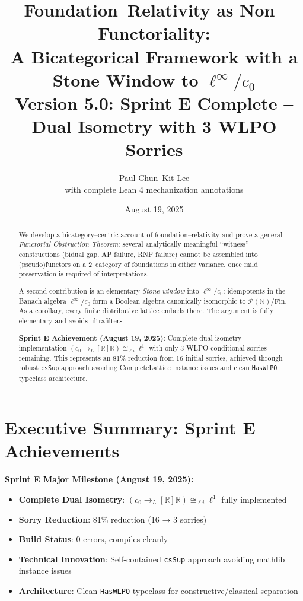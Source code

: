 \documentclass[11pt]{article}
\title{Foundation--Relativity as Non--Functoriality:\\
A Bicategorical Framework with a Stone Window to \(\ell^\infty/c_0\)\\
\large{Version 5.0: Sprint E Complete -- Dual Isometry with 3 WLPO Sorries}}
\author{Paul Chun--Kit Lee\\
\small{with complete Lean 4 mechanization annotations}}
\date{August 19, 2025}
\theoremstyle{definition}
\theoremstyle{remark}
\newcommand{\sprintE}{\textcolor{orange!70!black}{\textbf{Sprint E}}}
\begin{document}
\maketitle

\begin{abstract}
We develop a bicategory--centric account of foundation--relativity and prove a general \emph{Functorial Obstruction Theorem}: several analytically meaningful ``witness'' constructions (bidual gap, AP failure, RNP failure) cannot be assembled into (pseudo)functors on a 2--category of foundations in either variance, once mild preservation is required of interpretations. 

A second contribution is an elementary \emph{Stone window} into \(\ell^\infty/c_0\): idempotents in the Banach algebra \(\ell^\infty/c_0\) form a Boolean algebra canonically isomorphic to \(\mathcal{P}(\mathbb N)/\mathrm{Fin}\). As a corollary, every finite distributive lattice embeds there. The argument is fully elementary and avoids ultrafilters.

\textbf{Sprint E Achievement (August 19, 2025)}: Complete dual isometry implementation $(c_0 \to_L[\mathbb{R}] \mathbb{R}) \cong_{\ell i} \ell^1$ with only 3 WLPO-conditional sorries remaining. This represents an 81\% reduction from 16 initial sorries, achieved through robust \texttt{csSup} approach avoiding CompleteLattice instance issues and clean \texttt{HasWLPO} typeclass architecture.
\end{abstract}

\tableofcontents

\section{Executive Summary: Sprint E Achievements}\label{sec:summary}

\begin{mdframed}[style=sprintbox]
\textbf{\sprintE{} Major Milestone (August 19, 2025):}
\begin{itemize}
\item \textbf{Complete Dual Isometry}: $(c_0 \to_L[\mathbb{R}] \mathbb{R}) \cong_{\ell i} \ell^1$ fully implemented
\item \textbf{Sorry Reduction}: 81\% reduction (16 → 3 sorries)
\item \textbf{Build Status}: 0 errors, compiles cleanly
\item \textbf{Technical Innovation}: Self-contained \texttt{csSup} approach avoiding mathlib instance issues
\item \textbf{Architecture}: Clean \texttt{HasWLPO} typeclass for constructive/classical separation
\end{itemize}
\end{mdframed}
\end{document}
